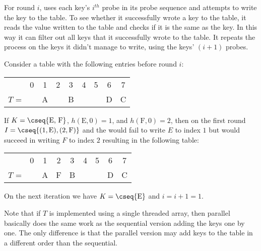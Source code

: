 For round $i$,  uses each key's $i^{th}$ probe in its
probe sequence and attempts to write the key to the table.  To see
whether it successfully wrote a key to the table, it reads the value
written to the table and checks if it is the same as the key. In this
way it can filter out all keys that it successfully wrote to the
table.  It repeats the process on the keys it didn't manage to write,
using the keys' $(i+1)$ probes.

\begin{example}
Consider a table with the following entries before
round $i$:
\begin{center}
\begin{tabular}{l c c c c c c c c }
      & 0 & 1 & 2 & 3 & 4 & 5 & 6 & 7 \\ \cline{2-9}
  $T$ = &   & A &   & B &   &   & D & C \\\cline{2-9}
\end{tabular}
\end{center}
If $K = \cseq{\mbox{E, F}}$, $h(\mbox{E},0) = 1$, and $h(\mbox{F},0) =
2$, then on the first round $I = \cseq{(1, \mbox{E}), (2, \mbox{F})}$ and the
 would fail to write $E$ to index $1$ but would
succeed in writing $F$ to index $2$ resulting in the following table:
\begin{center}
\begin{tabular}{l c c c c c c c c }
      & 0 & 1 & 2 & 3 & 4 & 5 & 6 & 7 \\ \cline{2-9}
  $T$ = &   & A & F & B &   &   & D & C \\\cline{2-9}
\end{tabular}
\end{center}
On the next iteration we have $K = \cseq{\mbox{E}}$ and $i = i+1 = 1$.
\end{example}

Note that if $T$ is implemented using a single threaded array, then
parallel  basically does the same work as the sequential
version adding the keys one by one. The only
difference is that the parallel version may add keys to the table in a
different order than the sequential.  

